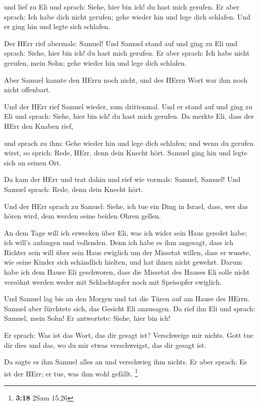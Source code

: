  und lief zu Eli und sprach: Siehe, hier bin ich! du hast
mich gerufen. Er aber sprach: Ich habe dich nicht gerufen; gehe wieder
hin und lege dich schlafen. Und er ging hin und legte sich schlafen.

 Der HErr rief abermals: Samuel! Und Samuel stand auf und
ging zu Eli und sprach: Siehe, hier bin ich! du hast mich gerufen. Er
aber sprach: Ich habe nicht gerufen, mein Sohn; gehe wieder hin und lege
dich schlafen.

 Aber Samuel kannte den HErrn noch nicht, und des HErrn Wort
war ihm noch nicht offenbart.

 Und der HErr rief Samuel wieder, zum drittenmal. Und er
stand auf und ging zu Eli und sprach: Siehe, hier bin ich! du hast mich
gerufen. Da merkte Eli, dass der HErr den Knaben rief,

 und sprach zu ihm: Gehe wieder hin und lege dich schlafen;
und wenn du gerufen wirst, so sprich: Rede, HErr, denn dein Knecht hört.
Samuel ging hin und legte sich an seinen Ort.

 Da kam der HErr und trat dahin und rief wie vormals:
Samuel, Samuel! Und Samuel sprach: Rede, denn dein Knecht hört.

 Und der HErr sprach zu Samuel: Siehe, ich tue ein Ding in
Israel, dass, wer das hören wird, dem werden seine beiden Ohren gellen.

 An dem Tage will ich erwecken über Eli, was ich wider sein
Haus geredet habe; ich will's anfangen und vollenden.  Denn
ich habe es ihm angesagt, dass ich Richter sein will über sein Haus
ewiglich um der Missetat willen, dass er wusste, wie seine Kinder sich
schändlich hielten, und hat ihnen nicht gewehrt.  Darum
habe ich dem Hause Eli geschworen, dass die Missetat des Hauses Eli
solle nicht versöhnt werden weder mit Schlachtopfer noch mit Speisopfer
ewiglich.

 Und Samuel lag bis an den Morgen und tat die Türen auf am
Hause des HErrn. Samuel aber fürchtete sich, das Gesicht Eli anzusagen.
 Da rief ihn Eli und sprach: Samuel, mein Sohn! Er
antwortete: Siehe, hier bin ich!

 Er sprach: Was ist das Wort, das dir gesagt ist?
Verschweige mir nichts. Gott tue dir dies und das, wo du mir etwas
verschweigst, das dir gesagt ist.

 Da sagte es ihm Samuel alles an und verschwieg ihm nichts.
Er aber sprach: Es ist der HErr; er tue, was ihm wohl gefällt.
\footnote{\textbf{3:18} 2Sam 15,26}


